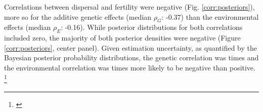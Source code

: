 \documentclass[11pt]{article}
\newcommand{\tom}[1]{{\textit{\color{WildStrawberry}{[#1]}}}}
\begin{document}
Correlations between dispersal and fertility were negative (Fig. \ref{corr:posteriors}), more so for the additive genetic effects (median $\rho_{G}$: -0.37) than the environmental effects (median $\rho_{E}$: -0.16).
While posterior distributions for both correlations included zero, the majority of both posterior densities were negative (Figure \ref{corr:posteriors}, center panel).
Given estimation uncertainty, as quantified by the Bayesian posterior probability distributions, the genetic correlation was \tom{$X$} times and the environmental correlation was \tom{$X$} times more likely to be negative than positive.
\footnote{\tom{[My thought here is that we should quantify how much of the posterior is negative vs positive, and this gives us a sense of confidence in the conclusion that correlations are negative.
As far as I am aware, I cannot do this myself because I don't have access to the posteriors.
So I think I will need Brad's help here. 
I think this is a simple but important addition, because from here on we assume that these negative correlations are real.]}}
\end{document}
